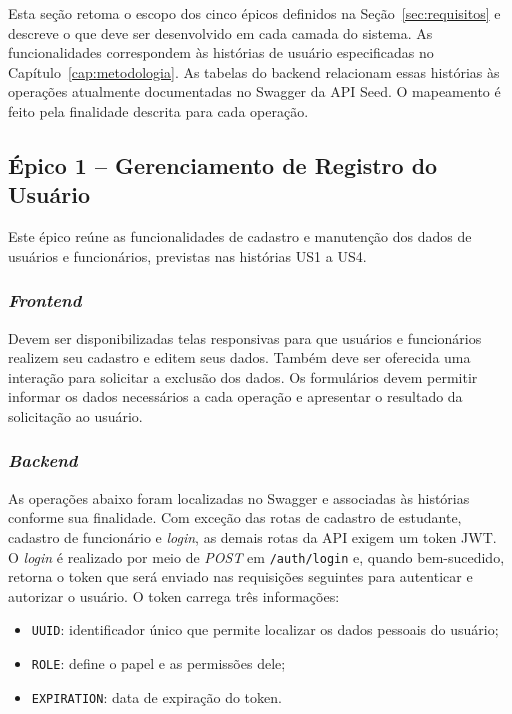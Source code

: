 Esta seção retoma o escopo dos cinco épicos definidos na Seção~\ref{sec:requisitos} e descreve o que deve ser desenvolvido em cada camada do sistema. As funcionalidades correspondem às histórias de usuário especificadas no Capítulo~\ref{cap:metodologia}. As tabelas do backend relacionam essas histórias às operações atualmente documentadas no Swagger da API Seed. O mapeamento é feito pela finalidade descrita para cada operação.

\subsection{Épico 1 -- Gerenciamento de Registro do Usuário}

Este épico reúne as funcionalidades de cadastro e manutenção dos dados de usuários e funcionários, previstas nas histórias US1 a US4.

\subsubsection{\textit{Frontend}}

Devem ser disponibilizadas telas responsivas para que usuários e funcionários realizem seu cadastro e editem seus dados. Também deve ser oferecida uma interação para solicitar a exclusão dos dados. Os formulários devem permitir informar os dados necessários a cada operação e apresentar o resultado da solicitação ao usuário.

\subsubsection{\textit{Backend}}

As operações abaixo foram localizadas no Swagger e associadas às histórias conforme sua finalidade. Com exceção das rotas de cadastro de estudante, cadastro de funcionário e \textit{login}, as demais rotas da API exigem um token JWT. O \textit{login} é realizado por meio de \textit{POST} em \texttt{/auth/login} e, quando bem-sucedido, retorna o token que será enviado nas requisições seguintes para autenticar e autorizar o usuário. O token carrega três informações:

\begin{itemize}
    \item \texttt{UUID}: identificador único que permite localizar os dados pessoais do usuário;
    \item \texttt{ROLE}: define o papel e as permissões dele;
    \item \texttt{EXPIRATION}: data de expiração do token.
\end{itemize}

